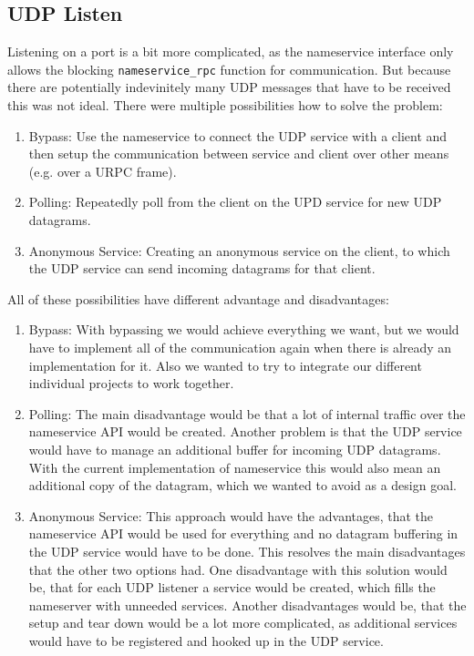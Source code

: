 \subsection{UDP Listen}
Listening on a port is a bit more complicated, as the nameservice interface only allows the blocking \verb|nameservice_rpc| function for communication. But because there are potentially indevinitely many UDP messages that have to be received this was not ideal. There were multiple possibilities how to solve the problem:
\begin{enumerate}
  \item Bypass: Use the nameservice to connect the UDP service with a client and then setup the communication between service and client over other means (e.g. over a URPC frame).
  \item Polling: Repeatedly poll from the client on the UPD service for new UDP datagrams.
  \item Anonymous Service: Creating an anonymous service on the client, to which the UDP service can send incoming datagrams for that client.
\end{enumerate}

All of these possibilities have different advantage and disadvantages:
\begin{enumerate}
  \item Bypass: With bypassing we would achieve everything we want, but we would have to implement all of the communication again when there is already an implementation for it. Also we wanted to try to integrate our different individual projects to work together.
  \item Polling: The main disadvantage would be that a lot of internal traffic over the nameservice API would be created. Another problem is that the UDP service would have to manage an additional buffer for incoming UDP datagrams. With the current implementation of nameservice this would also mean an additional copy of the datagram, which we wanted to avoid as a design goal.
  \item Anonymous Service: This approach would have the advantages, that the nameservice API would be used for everything and no datagram buffering in the UDP service would have to be done. This resolves the main disadvantages that the other two options had. One disadvantage with this solution would be, that for each UDP listener a service would be created, which fills the nameserver with unneeded services. Another disadvantages would be, that the setup and tear down would be a lot more complicated, as additional services would have to be registered and hooked up in the UDP service.
\end{enumerate}

